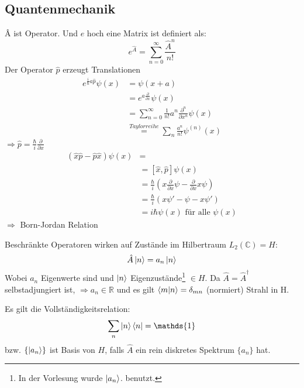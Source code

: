 	\subsection{Quantenmechanik}
		\^{A} ist Operator. Und $e$ hoch eine Matrix ist definiert als:
			\begin{equation*}
				e^{\hat{A}}= \sum_{n=0}^{\infty} \frac{\hat{A}^n}{n!}
			\end{equation*}
		Der Operator $\hat{p}$ erzeugt Translationen
			\begin{align*}
				e^{\frac{i}{\hbar} a \hat{p}} \psi(x) &= 
				\psi(x+a) \\
				&= e^{a \frac{\partial}{\partial x}} \psi(x) \\
				&= \sum_{n=0}^{\infty} \frac{1}{n!} a^n \frac{\partial^n}{\partial x^n} \psi(x) \\
				& \overset{Taylorreihe}{=} 
				\sum_{n} \frac{a^n}{n!} \psi^{(n)}(x)				
			\end{align*}
		$\Rightarrow \hat{p} = \frac{\hbar}{i} \frac{\partial}{\partial x}$
			\begin{align*}
				(\hat{x} \hat{p} - \hat{p} \hat{x}) \psi(x) &= \\
				&= [\hat{x}, \hat{p}] \psi(x) \\
				&= \frac{\hbar}{i} 
				\left( x \frac{\partial}{\partial x} \psi 
				- \frac{\partial}{\partial x} x \psi
				\right) \\
				&=\frac{\hbar}{i} \left( x \psi' - \psi - x\psi' \right) \\
				&=i \hbar \psi(x) \text{~für alle~} \psi (x)
			\end{align*}
		$ \Rightarrow$  \hspace{0.6cm} Born-Jordan Relation
		
		Beschränkte Operatoren wirken auf Zustände im Hilbertraum $L_2(\mathds{C}) = H$:
			\begin{equation*}
				\hat{A} \ket{n} = a_n \ket{n} 
			\end{equation*}
		Wobei $a_n$ Eigenwerte sind und $\ket{n}$ Eigenzustände\footnote{In der Vorlesung wurde $\ket{a_n}$. benutzt.} $\in H$.
		Da $\hat{A} = \hat{A}^\dagger$ selbstadjungiert ist, $\Rightarrow a_n \in \mathds{R}$ und es gilt $\braket{m | n} = \delta_{mn}$ (normiert) \grqq Strahl in H\grqq.
		
		Es gilt die Vollständigkeitsrelation:
			\begin{equation*}
				\sum_n \ket{n} \bra{n} = \mathds{1}
			\end{equation*}
		bzw. $\{ \ket{a_n} \}$ ist Basis von $H$, falls $\hat{A}$ ein rein diskretes Spektrum $\{a_n\}$ hat. 
		
